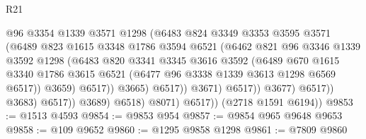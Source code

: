 \begin{lexlean}{R21}
\begin{coremodule}
                                      @96
                                      @3354
                                      @1339
                                      @3571
                                      @1298
                                      (@6483
                                        @824
                                        @3349
                                        @3353
                                        @3595
                                        @3571
                                        (@6489
                                          @823
                                          @1615
                                          @3348
                                          @1786
                                          @3594
                                          @6521
                                          (@6462
                                            @821
                                            @96
                                            @3346
                                            @1339
                                            @3592
                                            @1298
                                            (@6483
                                              @820
                                              @3341
                                              @3345
                                              @3616
                                              @3592
                                              (@6489
                                                @670
                                                @1615
                                                @3340
                                                @1786
                                                @3615
                                                @6521
                                                (@6477 @96 @3338 @1339 @3613 @1298 @6569 @6517))
                                              @3659)
                                            @6517))
                                        @3665)
                                      @6517))
                                  @3671)
                                @6517))
                            @3677)
                          @6517))
                      @3683)
                    @6517))
                @3689)
              @6518)
            @8071)
          @6517))
      (@2718 @1591 @6194))
@9853 := @1513 @4593
@9854 := @9853 @954
@9857 := @9854 @965 @9648 @9653
@9858 := @109 @9652
@9860 := @1295 @9858 @1298
@9861 := @7809 @9860

\end{coremodule}
\end{lexlean}
